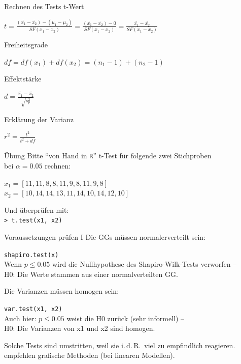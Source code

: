 \begin{frame}
  {Rechnen des Tests}
  t-Wert
  \begin{center}
    \alert{$t=$}$\frac{(\bar{x_1}-\bar{x_2})-(\mu_1-\mu_2)}{SF(x_1-x_2)}=\frac{(\bar{x_1}-\bar{x_2})-0}{SF(x_1-x_2)}=$\alert{$\frac{\bar{x_1}-\bar{x_2}}{SF(x_1-x_2)}$}
  \end{center}
  \pause
  Freiheitsgrade
  \begin{center}
    $df=df(x_1)+df(x_2)=(n_1-1)+(n_2-1)$
  \end{center}
  \pause
  Effektstärke
  \begin{center}
    $d=\frac{\bar{x_1}-\bar{x_2}}{\sqrt{s^2_p}}$
  \end{center}
  \pause
  Erklärung der Varianz
  \begin{center}
    $r^2=\frac{t^2}{t^2+df}$
  \end{center}
\end{frame}

\begin{frame}
  {Übung}
  Bitte "`von Hand in \texttt{R}"' t-Test für folgende zwei Stichproben\\
  bei $\alpha=0.05$ rechnen:\\
  \begin{center}
    $x_1=[11, 11, 8, 8, 11, 9, 8, 11, 9, 8]$\\
    $x_2=[10, 14, 14, 13, 11, 14, 10, 14, 12, 10]$
  \end{center}
  \pause
  \begin{center}
    Und überprüfen mit:\\
    \texttt{> t.test(x1, x2)}
  \end{center}
\end{frame}

\begin{frame}
  {Voraussetzungen prüfen I}
  Die \alert{GGs müssen normalerverteilt} sein:
  \begin{center}
    \texttt{shapiro.test(x)}\\
    Wenn $p\leq0.05$ wird die Nullhypothese des Shapiro-Wilk-Tests verworfen --\\
    H0: Die Werte stammen aus einer normalverteilten GG.
  \end{center}
  \pause
  Die \alert{Varianzen müssen homogen sein}:
  \begin{center}
    \texttt{var.test(x1, x2)}\\
    Auch hier: $p\leq0.05$ weist die H0 zurück (sehr informell) --\\
    H0: Die Varianzen von x1 und x2 sind homogen.
  \end{center}
\pause
\begin{center}
  \alert{Solche Tests sind umstritten, weil sie i.\,d.\,R.\ viel zu empfindlich reagieren.\\
    \citet{ZuurEa2009} empfehlen \zB grafische Methoden (bei linearen Modellen).}
\end{center}

\end{frame}


